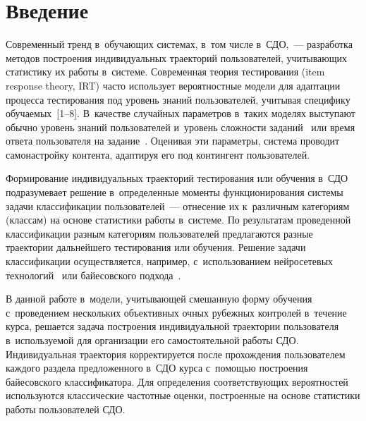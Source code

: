  



\thispagestyle{headings}

\begin{multicols}{2}

\label{st\stat}
  

\section{Введение}

      Современный тренд в~обучающих системах, в~том числе в~СДО,~--- 
      разработка методов построения индивидуальных 
траекторий пользователей, учитывающих статистику их работы в~системе. Современная 
тео\-рия тестирования (item response theory, IRT) часто использует вероятностные модели 
для адаптации процесса тестирования под уровень знаний пользователей, учитывая 
специфику обуча\-емых~[1--8]. В~качестве случайных параметров в~таких моделях 
выступают обычно уровень знаний пользователей и~уровень сложности  
заданий~\cite{2-bos, 6-bos} или время ответа пользователя на задание~\cite{7-bos, 8-bos}. 
Оценивая эти параметры, система проводит самонастройку контента, адаптируя его под 
контингент пользователей.
      
      Формирование индивидуальных траекторий тес\-ти\-ро\-ва\-ния или обучения 
в~СДО~\cite{3-bos, 4-bos, 5-bos} под\-ра\-зумевает решение в~определенные моменты 
функционирования системы задачи классификации пользователей~--- отнесение их 
к~различным категориям (классам) на основе статистики работы в~сис\-те\-ме. По 
результатам проведенной классификации разным категориям пользователей предлагаются 
разные траектории дальнейшего тестирования или обучения. Решение задачи 
классификации осуществляется, например, с~использованием нейросетевых 
технологий~\cite{9-bos, 10-bos, 11-bos} или байесовского подхода~\cite{12-bos, 13-bos}.
      
      В данной работе в~модели, учитывающей смешанную форму обучения 
с~проведением нескольких объективных очных рубежных контролей в~тече\-ние курса, 
решается задача построения индивидуальной траектории пользователя в~ис\-поль\-зу\-емой 
для организации его самостоятельной работы СДО. Индивидуальная траектория 
корректируется после прохождения пользователем каждого раздела предложенного 
в~СДО курса с~по\-мощью по\-стро\-ения байесовского классификатора. Для определения 
соответствующих вероятностей используются классические частотные оценки, 
построенные на основе статистики работы пользователей СДО. 


\end{multicols}
